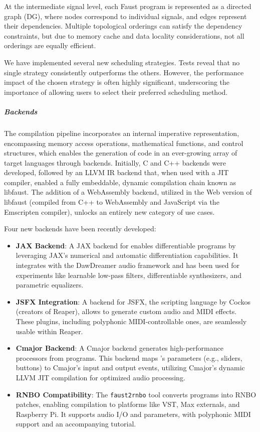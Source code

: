 At the intermediate signal level, each Faust program is represented as a directed graph (DG), where nodes correspond to
individual signals, and edges represent their dependencies. Multiple topological orderings can satisfy the dependency
constraints, but due to memory cache and data locality considerations, not all orderings are equally efficient.

We have implemented several new scheduling strategies. Tests reveal that no single strategy consistently outperforms the
others. However, the performance impact of the chosen strategy is often highly significant, underscoring the importance
of allowing users to select their preferred scheduling method.

\subparagraph{Backends}

The \F{} compilation pipeline incorporates an internal imperative representation, encompassing memory access operations,
mathematical functions, and control structures, which enables the generation of code in an ever-growing array of target
languages through backends. Initially, C and C++ backends were developed, followed by an LLVM IR backend that, when used
with a JIT compiler, enabled a fully embeddable, dynamic compilation chain known as libfaust. The addition of a
WebAssembly backend, utilized in the Web version of libfaust (compiled from C++ to WebAssembly and JavaScript via the
Emscripten compiler), unlocks an entirely new category of use cases.

Four new backends have been recently developed:

\begin{itemize}
\item
  \textbf{JAX Backend}: A JAX backend for \F{} enables differentiable \F{} programs by leveraging JAX's numerical and
  automatic differentiation capabilities. It integrates with the DawDreamer audio framework and has been used for
  experiments like learnable low-pass filters, differentiable synthesizers, and parametric equalizers.
\item
  \textbf{JSFX Integration}: A backend for JSFX, the scripting language by Cockos (creators of Reaper), allows \F{} to
  generate custom audio and MIDI effects. These plugins, including polyphonic MIDI-controllable ones, are seamlessly
  usable within Reaper.
\item
  \textbf{Cmajor Backend}: A Cmajor backend generates high-performance processors from \F{} programs. This backend maps
  \F{}'s parameters (e.g., sliders, buttons) to Cmajor's input and output events, utilizing Cmajor's dynamic LLVM JIT
  compilation for optimized audio processing.
\item
  \textbf{RNBO Compatibility}: The \texttt{faust2rnbo} tool converts \F{} programs into RNBO patches, enabling
  compilation to platforms like VST, Max externals, and Raspberry Pi. It supports audio I/O and parameters, with
  polyphonic MIDI support and an accompanying tutorial.
\end{itemize}


